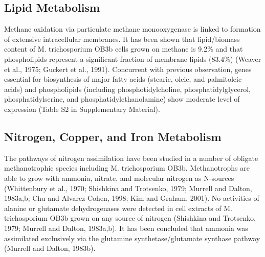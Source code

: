\subsection{Lipid Metabolism}
Methane oxidation via particulate methane monooxygenase is linked to formation of extensive intracellular membranes.
It has been shown that lipid/biomass content of M. trichosporium OB3b cells grown on methane is 9.2\% and that phospholipids represent a significant fraction of membrane lipids (83.4\%) (Weaver et al., 1975; Guckert et al., 1991).
Concurrent with previous observation, genes essential for biosynthesis of major fatty acids (stearic, oleic, and palmitoleic acids) and phospholipids (including phosphotidylcholine, phosphatidylglycerol, phosphatidylserine, and phosphatidylethanolamine) show moderate level of expression (Table S2 in Supplementary Material).

\subsection{Nitrogen, Copper, and Iron Metabolism}
The pathways of nitrogen assimilation have been studied in a number of obligate methanotrophic species including M. trichosporium OB3b.
Methanotrophs are able to grow with ammonia, nitrate, and molecular nitrogen as N-sources (Whittenbury et al., 1970; Shishkina and Trotsenko, 1979; Murrell and Dalton, 1983a,b; Chu and Alvarez-Cohen, 1998; Kim and Graham, 2001).
No activities of alanine or glutamate dehydrogenases were detected in cell extracts of M. trichosporium OB3b grown on any source of nitrogen (Shishkina and Trotsenko, 1979; Murrell and Dalton, 1983a,b).
It has been concluded that ammonia was assimilated exclusively via the glutamine synthetase/glutamate synthase pathway (Murrell and Dalton, 1983b).

